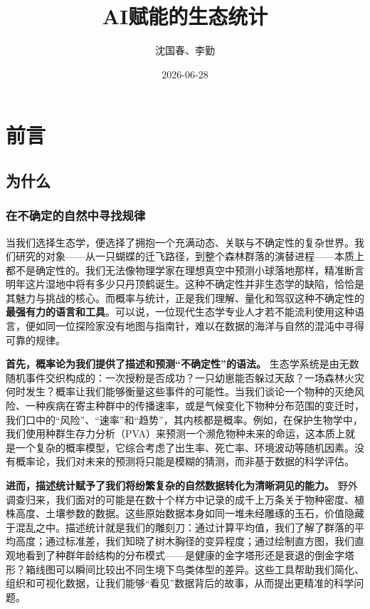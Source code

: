 \documentclass[
  twoside,12pt,fontset=none]{ctexbook}
\title{AI赋能的生态统计}
\author{沈国春、李勤}
\date{2026-06-28}
\begin{document}
\maketitle

{
\setcounter{tocdepth}{1}
\tableofcontents
}
\hypertarget{ux524dux8a00}{%
\chapter*{前言}\label{ux524dux8a00}}

\hypertarget{ux4e3aux4ec0ux4e48}{%
\section{为什么}\label{ux4e3aux4ec0ux4e48}}

\hypertarget{ux5728ux4e0dux786eux5b9aux7684ux81eaux7136ux4e2dux5bfbux627eux89c4ux5f8b}{%
\subsection{在不确定的自然中寻找规律}\label{ux5728ux4e0dux786eux5b9aux7684ux81eaux7136ux4e2dux5bfbux627eux89c4ux5f8b}}

当我们选择生态学，便选择了拥抱一个充满动态、关联与不确定性的复杂世界。我们研究的对象------从一只蝴蝶的迁飞路径，到整个森林群落的演替进程------本质上都不是确定性的。我们无法像物理学家在理想真空中预测小球落地那样，精准断言明年这片湿地中将有多少只丹顶鹤诞生。这种不确定性并非生态学的缺陷，恰恰是其魅力与挑战的核心。而概率与统计，正是我们理解、量化和驾驭这种不确定性的\textbf{最强有力的语言和工具}。可以说，一位现代生态学专业人才若不能流利使用这种语言，便如同一位探险家没有地图与指南针，难以在数据的海洋与自然的混沌中寻得可靠的规律。

\textbf{首先，概率论为我们提供了描述和预测``不确定性''的语法。} 生态学系统是由无数随机事件交织构成的：一次授粉是否成功？一只幼崽能否躲过天敌？一场森林火灾何时发生？概率让我们能够衡量这些事件的可能性。当我们谈论一个物种的灭绝风险、一种疾病在寄主种群中的传播速率，或是气候变化下物种分布范围的变迁时，我们口中的``风险''、``速率''和``趋势''，其内核都是概率。例如，在保护生物学中，我们使用种群生存力分析（PVA）来预测一个濒危物种未来的命运，这本质上就是一个复杂的概率模型，它综合考虑了出生率、死亡率、环境波动等随机因素。没有概率论，我们对未来的预测将只能是模糊的猜测，而非基于数据的科学评估。

\textbf{进而，描述统计赋予了我们将纷繁复杂的自然数据转化为清晰洞见的能力。} 野外调查归来，我们面对的可能是在数十个样方中记录的成千上万条关于物种密度、植株高度、土壤参数的数据。这些原始数据本身如同一堆未经雕琢的玉石，价值隐藏于混乱之中。描述统计就是我们的雕刻刀：通过计算平均值，我们了解了群落的平均高度；通过标准差，我们知晓了树木胸径的变异程度；通过绘制直方图，我们直观地看到了种群年龄结构的分布模式------是健康的金字塔形还是衰退的倒金字塔形？箱线图可以瞬间比较出不同生境下鸟类体型的差异。这些工具帮助我们简化、组织和可视化数据，让我们能够``看见''数据背后的故事，从而提出更精准的科学问题。
\end{document}
